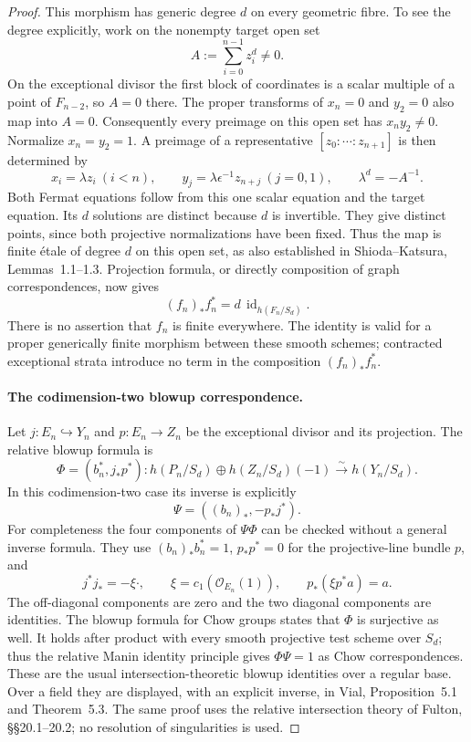 \documentclass[11pt]{article}
\theoremstyle{remark}\newtheorem{remark}[theorem]{Remark}
\begin{document}
\begin{proof}
This morphism has generic degree $d$ on every geometric fibre. To
see the degree explicitly, work on the nonempty target open set
\[
 A:=\sum_{i=0}^{n-1}z_i^d\ne0.
\]
On the exceptional divisor the first block of coordinates is a
scalar multiple of a point of $F_{n-2}$, so $A=0$ there. The
proper transforms of $x_n=0$ and $y_2=0$ also map into $A=0$.
Consequently every preimage on this open set has $x_ny_2\ne0$. Normalize
$x_n=y_2=1$. A preimage of a representative
$[z_0:\cdots:z_{n+1}]$ is then determined by
\[
 x_i=\lambda z_i\ (i<n),\qquad
 y_j=\lambda\epsilon^{-1}z_{n+j}\ (j=0,1),
 \qquad \lambda^d=-A^{-1}.
 \tag{F08.7}
\]
Both Fermat equations follow from this one scalar equation and the
target equation. Its $d$ solutions are distinct because $d$ is
invertible. They give distinct points, since both projective
normalizations have been fixed. Thus the map is finite \'etale of
degree $d$ on this open set, as also established in
Shioda--Katsura, Lemmas~1.1--1.3. Projection formula, or directly
composition of graph correspondences, now gives
\[
 (f_n)_*f_n^*=d\,\operatorname{id}_{h(F_n/S_d)}.
 \tag{F08.8}
\]
There is no assertion that $f_n$ is finite everywhere. The identity
is valid for a proper generically finite morphism between these
smooth schemes; contracted exceptional strata introduce no term in
the composition $(f_n)_*f_n^*$.

\paragraph{The codimension-two blowup correspondence.}
Let $j:E_n\hookrightarrow Y_n$ and $p:E_n\to Z_n$ be the exceptional
divisor and its projection. The relative blowup formula is
\[
 \Phi=(b_n^*,j_*p^*):
 h(P_n/S_d)\oplus h(Z_n/S_d)(-1)
       \xrightarrow{\ \sim\ }h(Y_n/S_d).
 \tag{F08.9}
\]
In this codimension-two case its inverse is explicitly
\[
 \Psi=((b_n)_*,-p_*j^*).
 \tag{F08.10}
\]
For completeness the four components of $\Psi\Phi$ can be checked
without a general inverse formula. They use
$(b_n)_*b_n^*=1$, $p_*p^*=0$ for the projective-line bundle $p$,
and
\[
 j^*j_*=-\xi\cdot,
 \qquad \xi=c_1(\mathcal O_{E_n}(1)),\qquad
 p_*(\xi p^*a)=a.
\]
The off-diagonal components are zero and the two diagonal
components are identities. The blowup formula for Chow groups
states that $\Phi$ is surjective as well. It holds after product
with every smooth projective test scheme over $S_d$; thus the
relative Manin identity principle gives $\Phi\Psi=1$ as Chow
correspondences. These are the usual intersection-theoretic
blowup identities over a regular base. Over a field they are
displayed, with an explicit inverse, in Vial, Proposition~5.1 and
Theorem~5.3. The same proof uses the relative intersection theory
of Fulton, \S\S20.1--20.2; no resolution of singularities is used.


\end{proof}
\end{document}
